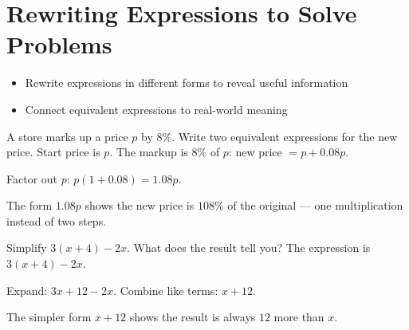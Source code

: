\section{Rewriting Expressions to Solve Problems}

\begin{stepGoal}
\begin{itemize}
    \item Rewrite expressions in different forms to reveal useful information
    \item Connect equivalent expressions to real-world meaning
\end{itemize}
\end{stepGoal}

\begin{stepVocabBox}
\end{stepVocabBox}

\begin{stepsCard}
\end{stepsCard}

\begin{stepExample}{A store marks up a price $p$ by $8\%$. Write two equivalent expressions for the new price.}
     Start price is $p$. The markup is $8\%$ of $p$: new price $= p + 0.08p$.

     Factor out $p$: $p(1 + 0.08) = 1.08p$.

     The form $1.08p$ shows the new price is $108\%$ of the original --- one multiplication instead of two steps.
\end{stepExample}

\begin{stepExample}{Simplify $3(x + 4) - 2x$. What does the result tell you?}
     The expression is $3(x + 4) - 2x$.

     Expand: $3x + 12 - 2x$. Combine like terms: $x + 12$.

     The simpler form $x + 12$ shows the result is always $12$ more than $x$.
\end{stepExample}

